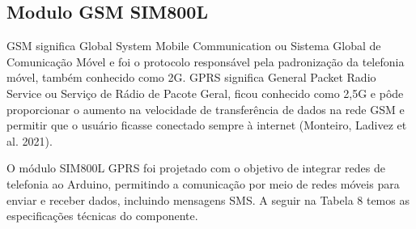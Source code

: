 \subsection{Modulo GSM SIM800L}

GSM significa Global System Mobile Communication ou Sistema Global de Comunicação Móvel e foi o protocolo responsável pela padronização da telefonia móvel, também conhecido como 2G. GPRS significa General Packet Radio Service ou Serviço de Rádio de Pacote Geral, ficou conhecido como 2,5G e pôde proporcionar o aumento na velocidade de transferência de dados na rede GSM e permitir que o usuário ficasse conectado sempre à internet (Monteiro, Ladivez et al. 2021).

O módulo SIM800L GPRS foi projetado com o objetivo de integrar redes de telefonia ao Arduino, permitindo a comunicação por meio de redes móveis para enviar e receber dados, incluindo mensagens SMS. A seguir na Tabela 8 temos as especificações técnicas do componente.